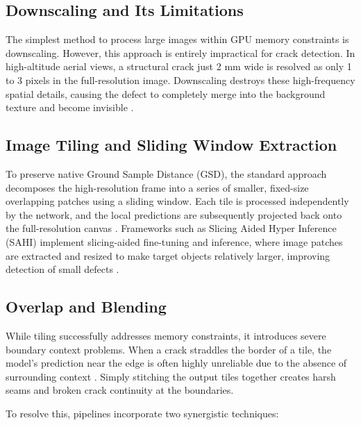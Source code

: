 \subsection{Downscaling and Its Limitations}
\label{subsec:downscaling_and_its_limitation}
\hs The simplest method to process large images within GPU memory constraints is downscaling. However, this approach is entirely impractical for crack detection. In high-altitude aerial views, a structural crack just 2 mm wide is resolved as only 1 to 3 pixels in the full-resolution image. Downscaling destroys these high-frequency spatial details, causing the defect to completely merge into the background texture and become invisible \cite{33-huang-2019-tiling-stitching}.

\newpage

\subsection{Image Tiling and Sliding Window Extraction}
\label{subsec:image_tiling_and_sliding_window_extraction}
\hs To preserve native Ground Sample Distance (GSD), the standard approach decomposes the high-resolution frame into a series of smaller, fixed-size overlapping patches using a sliding window. Each tile is processed independently by the network, and the local predictions are subsequently projected back onto the full-resolution canvas \cite{33-huang-2019-tiling-stitching, 34-zhang-2023}. Frameworks such as Slicing Aided Hyper Inference (SAHI) implement slicing-aided fine-tuning and inference, where image patches are extracted and resized to make target objects relatively larger, improving detection of small defects \cite{25-akyon-2022-sahi}.

\subsection{Overlap and Blending}
\label{subsec:overlap_and_blending}
\hs While tiling successfully addresses memory constraints, it introduces severe boundary context problems. When a crack straddles the border of a tile, the model's prediction near the edge is often highly unreliable due to the absence of surrounding context \cite{25-akyon-2022-sahi, 34-zhang-2023, 35-kim-2026-tiled-prompts}. Simply stitching the output tiles together creates harsh seams and broken crack continuity at the boundaries.

To resolve this, pipelines incorporate two synergistic techniques:

